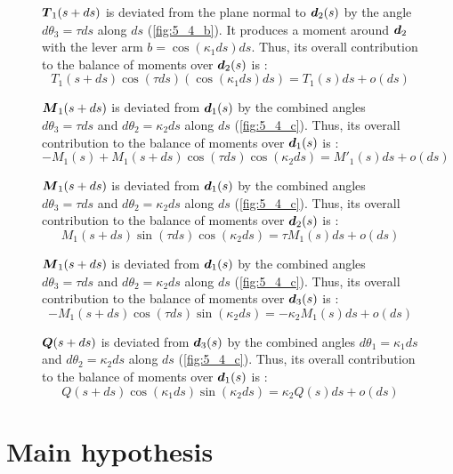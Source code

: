 \begin{figure}[p]
\begin{fullpage}
		$\boldsymbol{T}_1(s+ds)$ is deviated from the plane normal to $\boldsymbol{d}_2(s)$ by the angle $d\theta_3 = \tau ds$ along $ds$ (\cref{fig:5_4_b}). It produces a moment around $\boldsymbol{d}_2$ with the lever arm $b =  \cos(\kappa_1 ds) ds$. Thus, its overall contribution to the balance of moments over $\boldsymbol{d}_2(s)$ is : 
	\begin{equation*}
		T_1(s+ds) \cos(\tau ds) (\cos(\kappa_1 ds) ds) = T_1(s) ds + o(ds)
	\end{equation*}
	
	$\boldsymbol{M}_1(s+ds)$ is deviated from $\boldsymbol{d}_1(s)$ by the combined angles $d\theta_3 = \tau ds$ and $d\theta_2 = \kappa_2 ds$ along $ds$ (\cref{fig:5_4_c}). Thus, its overall contribution to the balance of moments over $\boldsymbol{d}_1(s)$ is : 
	\begin{equation*}
		-M_1(s) + M_1(s+ds) \cos(\tau ds) \cos(\kappa_2 ds) = M'_1 (s) ds + o(ds)
	\end{equation*}	
	
	$\boldsymbol{M}_1(s+ds)$ is deviated from $\boldsymbol{d}_1(s)$ by the combined angles $d\theta_3 = \tau ds$ and $d\theta_2 = \kappa_2 ds$ along $ds$ (\cref{fig:5_4_c}). Thus, its overall contribution to the balance of moments over $\boldsymbol{d}_2(s)$ is : 
	\begin{equation*}
		M_1(s+ds) \sin(\tau ds) \cos(\kappa_2 ds) = \tau M_1 (s) ds + o(ds)
	\end{equation*}	
	
	$\boldsymbol{M}_1(s+ds)$ is deviated from $\boldsymbol{d}_1(s)$ by the combined angles $d\theta_3 = \tau ds$ and $d\theta_2 = \kappa_2 ds$ along $ds$ (\cref{fig:5_4_c}). Thus, its overall contribution to the balance of moments over $\boldsymbol{d}_3(s)$ is : 
	\begin{equation*}
		-M_1(s+ds) \cos(\tau ds) \sin(\kappa_2 ds) = -\kappa_2 M_1 (s) ds + o(ds)
	\end{equation*}	
	
	$\boldsymbol{Q}(s+ds)$ is deviated from $\boldsymbol{d}_3(s)$ by the combined angles $d\theta_1 = \kappa_1 ds$ and $d\theta_2 = \kappa_2 ds$ along $ds$ (\cref{fig:5_4_c}). Thus, its overall contribution to the balance of moments over $\boldsymbol{d}_1(s)$ is : 
	\begin{equation*}
		Q(s+ds) \cos(\kappa_1 ds) \sin(\kappa_2 ds) = \kappa_2 Q(s) ds + o(ds)
	\end{equation*}	
	  \end{fullpage}
\end{figure}



\section{Main hypothesis}

